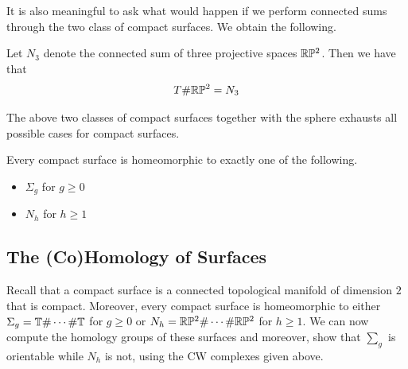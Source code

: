 \documentclass[a4paper]{article}
\begin{document}
It is also meaningful to ask what would happen if we perform connected sums through the two class of compact surfaces. We obtain the following. 

\begin{prp}{}{} Let $N_3$ denote the connected sum of three projective spaces $\mathbb{R}\mathbb{P}^2$. Then we have that $$T\#\mathbb{R}\mathbb{P}^2=N_3$$ 
\end{prp}

The above two classes of compact surfaces together with the sphere exhausts all possible cases for compact surfaces. 

\begin{thm}{}{} Every compact surface is homeomorphic to exactly one of the following. 
\begin{itemize}
\item $\Sigma_g$ for $g\geq 0$
\item $N_h$ for $h\geq 1$
\end{itemize}
\end{thm}

\subsection{The (Co)Homology of Surfaces}
Recall that a compact surface is a connected topological manifold of dimension $2$ that is compact. Moreover, every compact surface is homeomorphic to either $\Sigma_g=\mathbb{T}\#\cdots\#\mathbb{T}$ for $g\geq 0$ or $N_h=\mathbb{R}\mathbb{P}^2\#\cdots\#\mathbb{R}\mathbb{P}^2$ for $h\geq 1$. We can now compute the homology groups of these surfaces and moreover, show that $\sum_g$ is orientable while $N_h$ is not, using the CW complexes given above. 
\end{document}
